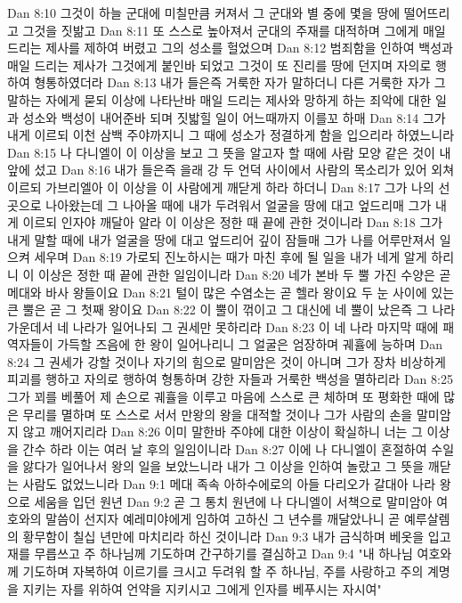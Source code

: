 Dan 8:10  그것이 하늘 군대에 미칠만큼 커져서 그 군대와 별 중에 몇을 땅에 떨어뜨리고 그것을 짓밞고
Dan 8:11  또 스스로 높아져서 군대의 주재를 대적하며 그에게 매일 드리는 제사를 제하여 버렸고 그의 성소를 헐었으며
Dan 8:12  범죄함을 인하여 백성과 매일 드리는 제사가 그것에게 붙인바 되었고 그것이 또 진리를 땅에 던지며 자의로 행하여 형통하였더라
Dan 8:13  내가 들은즉 거룩한 자가 말하더니 다른 거룩한 자가 그 말하는 자에게 묻되 이상에 나타난바 매일 드리는 제사와 망하게 하는 죄악에 대한 일과 성소와 백성이 내어준바 되며 짓밟힐 일이 어느때까지 이를꼬 하매
Dan 8:14  그가 내게 이르되 이천 삼백 주야까지니 그 때에 성소가 정결하게 함을 입으리라 하였느니라
Dan 8:15  나 다니엘이 이 이상을 보고 그 뜻을 알고자 할 때에 사람 모양 같은 것이 내 앞에 섰고
Dan 8:16  내가 들은즉 을래 강 두 언덕 사이에서 사람의 목소리가 있어 외쳐 이르되 가브리엘아 이 이상을 이 사람에게 깨닫게 하라 하더니
Dan 8:17  그가 나의 선 곳으로 나아왔는데 그 나아올 때에 내가 두려워서 얼굴을 땅에 대고 엎드리매 그가 내게 이르되 인자야 깨달아 알라 이 이상은 정한 때 끝에 관한 것이니라
Dan 8:18  그가 내게 말할 때에 내가 얼굴을 땅에 대고 엎드리어 깊이 잠들매 그가 나를 어루만져서 일으켜 세우며
Dan 8:19  가로되 진노하시는 때가 마친 후에 될 일을 내가 네게 알게 하리니 이 이상은 정한 때 끝에 관한 일임이니라
Dan 8:20  네가 본바 두 뿔 가진 수양은 곧 메대와 바사 왕들이요
Dan 8:21  털이 많은 수염소는 곧 헬라 왕이요 두 눈 사이에 있는 큰 뿔은 곧 그 첫째 왕이요
Dan 8:22  이 뿔이 꺾이고 그 대신에 네 뿔이 났은즉 그 나라 가운데서 네 나라가 일어나되 그 권세만 못하리라
Dan 8:23  이 네 나라 마지막 때에 패역자들이 가득할 즈음에 한 왕이 일어나리니 그 얼굴은 엄장하며 궤휼에 능하며
Dan 8:24  그 권세가 강할 것이나 자기의 힘으로 말미암은 것이 아니며 그가 장차 비상하게 피괴를 행하고 자의로 행하여 형통하며 강한 자들과 거룩한 백성을 멸하리라
Dan 8:25  그가 꾀를 베풀어 제 손으로 궤휼을 이루고 마음에 스스로 큰 체하며 또 평화한 때에 많은 무리를 멸하며 또 스스로 서서 만왕의 왕을 대적할 것이나 그가 사람의 손을 말미암지 않고 깨어지리라
Dan 8:26  이미 말한바 주야에 대한 이상이 확실하니 너는 그 이상을 간수 하라 이는 여러 날 후의 일임이니라
Dan 8:27  이에 나 다니엘이 혼절하여 수일을 앓다가 일어나서 왕의 일을 보았느니라 내가 그 이상을 인하여 놀랐고 그 뜻을 깨닫는 사람도 없었느니라
Dan 9:1  메대 족속 아하수에로의 아들 다리오가 갈대아 나라 왕으로 세움을 입던 원년
Dan 9:2  곧 그 통치 원년에 나 다니엘이 서책으로 말미암아 여호와의 말씀이 선지자 예레미야에게 임하여 고하신 그 년수를 깨달았나니 곧 예루살렘의 황무함이 칠십 년만에 마치리라 하신 것이니라
Dan 9:3  내가 금식하며 베옷을 입고 재를 무릅쓰고 주 하나님께 기도하며 간구하기를 결심하고
Dan 9:4  "내 하나님 여호와께 기도하며 자복하여 이르기를 크시고 두려워 할 주 하나님, 주를 사랑하고 주의 계명을 지키는 자를 위하여 언약을 지키시고 그에게 인자를 베푸시는 자시여"
